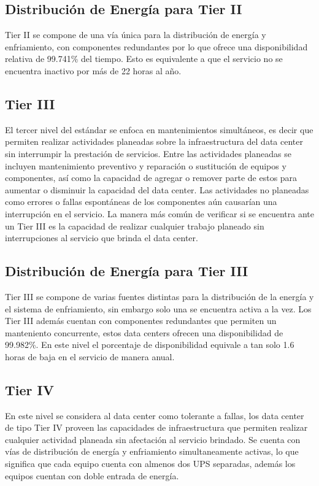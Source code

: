\documentclass[journal]{IEEEtran}
\begin{document}
\subsection{Distribución de Energía para Tier II}
Tier II se compone de una vía única para la distribución de energía y enfriamiento, con componentes redundantes por lo que ofrece una disponibilidad relativa de 99.741\% del tiempo. Esto es equivalente a 
que el servicio no se encuentra inactivo por más de 22 horas al año.
\subsection{Tier III}
El tercer nivel del estándar se enfoca en mantenimientos simultáneos, es decir que permiten realizar actividades planeadas sobre la infraestructura del data center sin interrumpir la prestación de servicios.
Entre las actividades planeadas se incluyen mantenimiento preventivo y reparación o sustitución de equipos y componentes, así como la capacidad de agregar o remover parte de estos para aumentar o disminuir la capacidad
del data center. 
Las actividades no planeadas como errores o fallas espontáneas de los componentes aún causarían una interrupción en el servicio. La manera más común de verificar si se encuentra ante un Tier III es la capacidad de realizar cualquier
trabajo planeado sin interrupciones al servicio que brinda el data center.
\subsection{Distribución de Energía para Tier III}
Tier III se compone de varias fuentes distintas para la distribución de la energía y el sistema de enfriamiento, sin embargo solo una se encuentra activa a la vez. Los Tier III además cuentan con componentes redundantes que permiten
un manteniento concurrente, estos data centers ofrecen una disponibilidad de 99.982\%. En este nivel el porcentaje de disponibilidad equivale a tan solo 1.6 horas de baja en el servicio de manera anual.
\subsection{Tier IV}
En este nivel se considera al data center como tolerante a fallas, los data center de tipo Tier IV proveen las capacidades de infraestructura que permiten realizar cualquier actividad planeada sin afectación al servicio 
brindado. Se cuenta con vías de distribución de energía y enfriamiento simultaneamente activas, lo que significa que cada equipo cuenta con almenos dos UPS separadas, además los equipos cuentan con doble entrada de energía.
\end{document}
